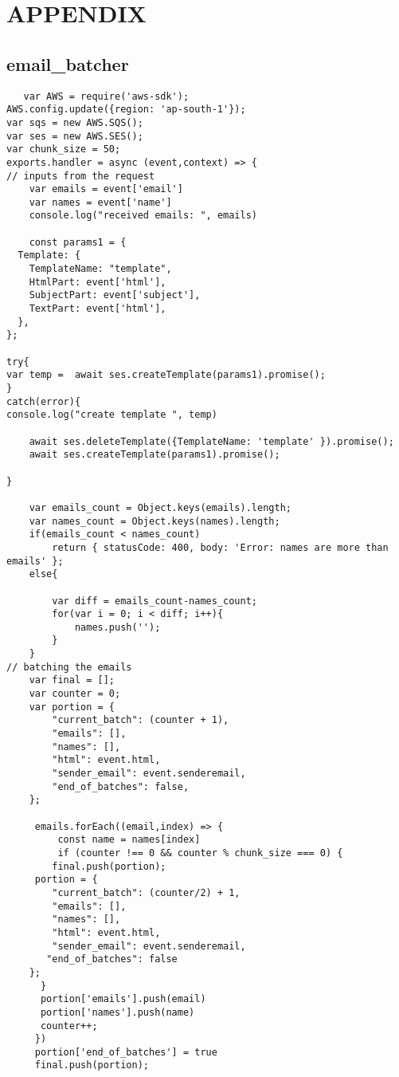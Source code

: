 \chapter*{APPENDIX}

\appendix
\section*{email\_batcher}
\begin{lstlisting}
   var AWS = require('aws-sdk');
AWS.config.update({region: 'ap-south-1'});
var sqs = new AWS.SQS();
var ses = new AWS.SES();
var chunk_size = 50;
exports.handler = async (event,context) => {
// inputs from the request 
    var emails = event['email']
    var names = event['name']
    console.log("received emails: ", emails)
    
    const params1 = {
  Template: {
    TemplateName: "template", 
    HtmlPart: event['html'],
    SubjectPart: event['subject'],
    TextPart: event['html'],
  },
};

try{
var temp =  await ses.createTemplate(params1).promise();
}
catch(error){
console.log("create template ", temp)

    await ses.deleteTemplate({TemplateName: 'template' }).promise();
    await ses.createTemplate(params1).promise();

}

    var emails_count = Object.keys(emails).length;
    var names_count = Object.keys(names).length;
    if(emails_count < names_count)
        return { statusCode: 400, body: 'Error: names are more than emails' }; 
    else{

        var diff = emails_count-names_count;
        for(var i = 0; i < diff; i++){
            names.push('');
        }
    }
// batching the emails
    var final = [];
    var counter = 0;
    var portion = {
        "current_batch": (counter + 1),
        "emails": [],
        "names": [],
        "html": event.html,
        "sender_email": event.senderemail,
        "end_of_batches": false,
    };

     emails.forEach((email,index) => {
         const name = names[index]
         if (counter !== 0 && counter % chunk_size === 0) {
        final.push(portion);
     portion = {
        "current_batch": (counter/2) + 1,
        "emails": [],
        "names": [],
        "html": event.html,
        "sender_email": event.senderemail,
       "end_of_batches": false
    };
      }
      portion['emails'].push(email)
      portion['names'].push(name)
      counter++;
     })
     portion['end_of_batches'] = true
     final.push(portion);


\end{lstlisting}
